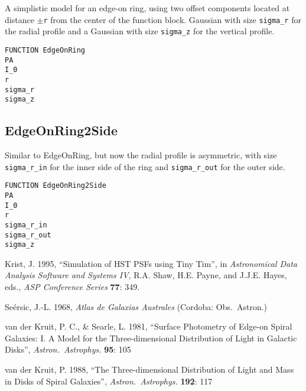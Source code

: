 \documentclass[10pt]{article}
\begin{document}
A simplistic model for an edge-on ring, using two offset components located
at distance $\pm$\texttt{r} from the center of the function block. Gaussian with size
\texttt{sigma\_r} for the radial profile and a Gaussian with
size \texttt{sigma\_z} for the vertical profile.

\begin{verbatim}
FUNCTION EdgeOnRing
PA
I_0
r
sigma_r
sigma_z
\end{verbatim}


\subsection{EdgeOnRing2Side}

Similar to EdgeOnRing, but now the radial profile is asymmetric, with size
\texttt{sigma\_r\_in} for the inner side of the ring and \texttt{sigma\_r\_out} for the
outer side.

\begin{verbatim}
FUNCTION EdgeOnRing2Side
PA
I_0
r
sigma_r_in
sigma_r_out
sigma_z
\end{verbatim}






\begin{thebibliography}{}

 Krist, J. 1995, ``Simulation of HST PSFs using Tiny Tim'', 
in \textit{Astronomical Data Analysis Software and Systems IV}, 
R.A. Shaw, H.E. Payne, and J.J.E. Hayes, eds., \textit{ASP Conference Series} \textbf{77}: 349.

 Se{\'e}rsic, J.-L. 1968, \textit{Atlas de 
Galaxias Australes} (Cordoba: Obs.\ Astron.)

 van der Kruit, P. C., \&
Searle, L. 1981, ``Surface Photometry of Edge-on Spiral Galaxies: I. A
Model for the Three-dimensional Distribution of Light in Galactic
Disks'', \textit{Astron.\ Astrophys.} \textbf{95}: 105

 van der Kruit, P. 1988, ``The
Three-dimensional Distribution of Light and Mass in Disks of Spiral
Galaxies'', \textit{Astron.\ Astrophys.} \textbf{192}: 117


\end{thebibliography}
%
\end{document}

